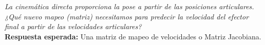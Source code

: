 \documentclass[11pt, a4paper]{article}
\begin{document}
\begin{tcolorbox}[colback=white, colframe=black, title=Pregunta de Transición]
    \textit{La cinemática directa proporciona la pose a partir de las posiciones articulares. ¿Qué nuevo mapeo (matriz) necesitamos para predecir la velocidad del efector final a partir de las velocidades articulares?} \\
    \textbf{Respuesta esperada:} Una matriz de mapeo de velocidades o Matriz Jacobiana.
\end{tcolorbox}
\end{document}
